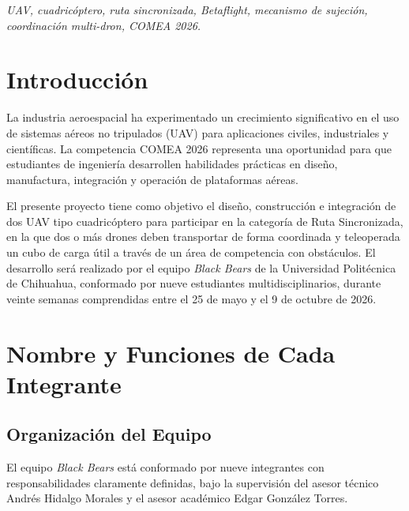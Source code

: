 \documentclass[10pt, twocolumn, letterpaper]{article}
\begin{document}
{\fontsize{9}{11}\itshape UAV, cuadricóptero, ruta sincronizada, Betaflight, mecanismo
de sujeción, coordinación multi-dron, COMEA 2026.}
\vspace{6pt}

\section{Introducción}
La industria aeroespacial ha experimentado un crecimiento significativo en el uso
de sistemas aéreos no tripulados (UAV) para aplicaciones civiles, industriales y
científicas. La competencia COMEA 2026 representa una oportunidad para que
estudiantes de ingeniería desarrollen habilidades prácticas en diseño, manufactura,
integración y operación de plataformas aéreas.

El presente proyecto tiene como objetivo el diseño, construcción e integración de
dos UAV tipo cuadricóptero para participar en la categoría de Ruta Sincronizada,
en la que dos o más drones deben transportar de forma coordinada y teleoperada
un cubo de carga útil a través de un área de competencia con obstáculos. El
desarrollo será realizado por el equipo \textit{Black Bears} de la Universidad
Politécnica de Chihuahua, conformado por nueve estudiantes multidisciplinarios,
durante veinte semanas comprendidas entre el 25 de mayo y el 9 de octubre de 2026.

\section{Nombre y Funciones de Cada Integrante}
\subsection{Organización del Equipo}
El equipo \textit{Black Bears} está conformado por nueve integrantes con
responsabilidades claramente definidas, bajo la supervisión del asesor técnico
Andrés Hidalgo Morales y el asesor académico Edgar González Torres.
\end{document}
